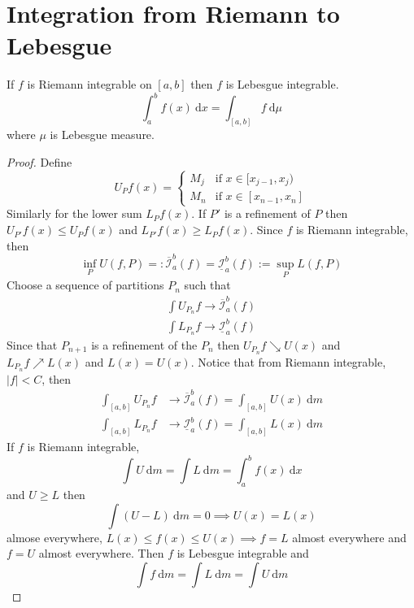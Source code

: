\section{Integration from Riemann to Lebesgue}

\begin{theorem}
  If $f$ is Riemann integrable on $[a, b]$ then $f$ is Lebesgue integrable.
  \[\int_a^b f(x)\ \mathrm{d}x = \int_{[a, b]}f \ \mathrm{d}\mu\]
  where $\mu$ is Lebesgue measure.
\end{theorem}

\begin{proof}
  Define
  \[U_Pf(x) = \begin{cases}
    M_j & \text{if } x \in [x_{j-1}, x_j) \\
    M_n & \text{if } x \in [x_{n-1}, x_n]
  \end{cases}\]
  Similarly for the lower sum $L_Pf(x)$. 
  If $P'$ is a refinement of $P$ then $U_{P'}f(x) \le U_Pf(x)$ and $L_{P'}f(x) \ge L_Pf(x)$.
  Since $f$ is Riemann integrable, then
  \[\inf_P U(f, P) =: \overline{\mathcal{I}}_a^b(f) = \underline{\mathcal{I}}_a^b(f) := \sup_P L(f, P)\]
  Choose a sequence of partitions $P_n$ such that
  \begin{align*}
    \int U_{P_n}f \to \overline{\mathcal{I}}_a^b(f) \\
    \int L_{P_n}f \to \underline{\mathcal{I}}_a^b(f)
  \end{align*}
  Since that $P_{n+1}$ is a refinement of the $P_n$ then $U_{P_n}f \searrow U(x)$ and 
  $L_{P_n}f \nearrow L(x)$ and $L(x) = U(x)$.
  Notice that from Riemann integrable, $|f| < C$, then
  \begin{align*}
    \int_{[a, b]} U_{P_n}f &\to \overline{\mathcal{I}}_a^b(f) = \int_{[a, b]} U(x)\ \mathrm{d}m\\
    \int_{[a, b]} L_{P_n}f &\to \underline{\mathcal{I}}_a^b(f) =\int_{[a, b]} L(x)\ \mathrm{d}m
  \end{align*}
  If $f$ is Riemann integrable, 
  \[\int U \ \mathrm{d}m = \int L \ \mathrm{d}m = \int_a^b f(x) \ \mathrm{d}x\]
  and $U \ge L$ then
  \[\int (U-L)\ \mathrm{d}m = 0 \implies U(x) = L(x)\]
  almose everywhere, $L(x) \le f(x) \le U(x) \implies f = L$ almost everywhere and $f = U$ almost everywhere.
  Then $f$ is Lebesgue integrable and
  \[\int f \ \mathrm{d}m = \int L \ \mathrm{d}m = \int U \ \mathrm{d}m\]
\end{proof}

